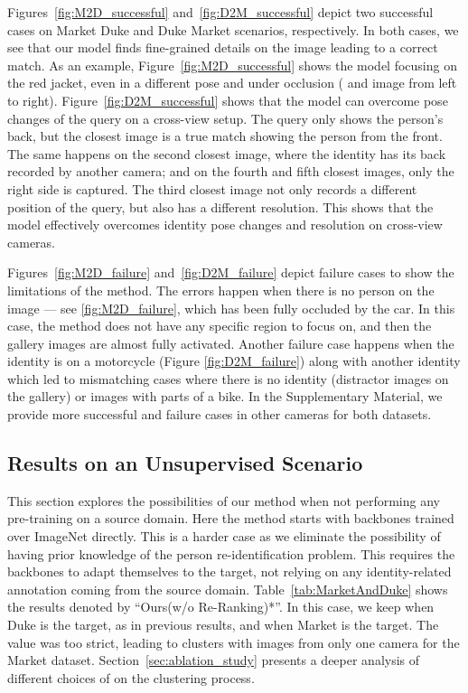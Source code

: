 \documentclass[journal]{IEEEtran}
\begin{document}
Figures~\ref{fig:M2D_successful} and~\ref{fig:D2M_successful} depict two successful cases on Market  Duke and Duke  Market scenarios, respectively. In both cases, we see that our model finds fine-grained details on the image leading to a correct match.  As an example, Figure~\ref{fig:M2D_successful} shows the model focusing on the red jacket, even in a different pose and under occlusion ( and  image from left to right). Figure~\ref{fig:D2M_successful} shows that the model can overcome pose changes of the query on a cross-view setup. The query only shows the person's back, but the closest image is a true match showing the person from the front. The same happens on the second closest image, where the identity has its back recorded by another camera; and on the fourth and fifth closest images, only the right side is captured. The third closest image not only records a different position of the query, but also has a different resolution. This shows that the model effectively overcomes identity pose changes and resolution on cross-view cameras. 

Figures~\ref{fig:M2D_failure} and~\ref{fig:D2M_failure} depict failure cases to show the limitations of the method. The errors happen when there is no person on the image --- see \ref{fig:M2D_failure}, which has been fully occluded by the car. In this case, the method does not have any specific region to focus on, and then the gallery images are almost fully activated. Another failure case happens when the identity is on a motorcycle (Figure \ref{fig:D2M_failure}) along with another identity which led to mismatching cases where there is no identity (distractor images on the gallery) or images with parts of a bike. In the  Supplementary Material, we provide more successful and failure cases in other cameras for both datasets.

\subsection{Results on an Unsupervised Scenario} \label{subsec:results_unsupervised}

This section explores the possibilities of our method when not performing any pre-training on a source domain. Here the method starts with backbones trained over ImageNet directly. This is a harder case as we eliminate the possibility of having prior knowledge of the person re-identification problem. This requires the backbones to adapt themselves to the target, not relying on any identity-related annotation coming from the source domain. Table~\ref{tab:MarketAndDuke} shows the results denoted by ``Ours(w/o Re-Ranking)*''. In this case, we keep  when Duke is the target, as in previous results, and  when Market is the target. The value  was too strict, leading to clusters with images from only one camera for the Market dataset. Section~\ref{sec:ablation_study} presents a deeper analysis of different choices of  on the clustering process. 
\end{document}
